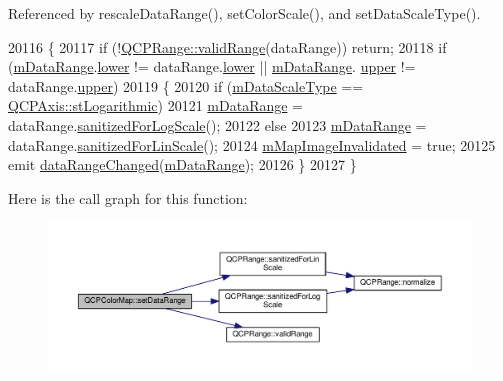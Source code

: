 Referenced by rescale\+Data\+Range(), set\+Color\+Scale(), and set\+Data\+Scale\+Type().


\begin{DoxyCode}
20116 \{
20117   \textcolor{keywordflow}{if} (!\hyperlink{class_q_c_p_range_ab38bd4841c77c7bb86c9eea0f142dcc0}{QCPRange::validRange}(dataRange)) \textcolor{keywordflow}{return};
20118   \textcolor{keywordflow}{if} (\hyperlink{class_q_c_p_color_map_ab87609621d16cd3e9d52ad070b327b08}{mDataRange}.\hyperlink{class_q_c_p_range_aa3aca3edb14f7ca0c85d912647b91745}{lower} != dataRange.\hyperlink{class_q_c_p_range_aa3aca3edb14f7ca0c85d912647b91745}{lower} || \hyperlink{class_q_c_p_color_map_ab87609621d16cd3e9d52ad070b327b08}{mDataRange}.
      \hyperlink{class_q_c_p_range_ae44eb3aafe1d0e2ed34b499b6d2e074f}{upper} != dataRange.\hyperlink{class_q_c_p_range_ae44eb3aafe1d0e2ed34b499b6d2e074f}{upper})
20119   \{
20120     \textcolor{keywordflow}{if} (\hyperlink{class_q_c_p_color_map_ab28a4b2def408f83b9818799d5f18446}{mDataScaleType} == \hyperlink{class_q_c_p_axis_a36d8e8658dbaa179bf2aeb973db2d6f0abf5b785ad976618816dc6f79b73216d4}{QCPAxis::stLogarithmic})
20121       \hyperlink{class_q_c_p_color_map_ab87609621d16cd3e9d52ad070b327b08}{mDataRange} = dataRange.\hyperlink{class_q_c_p_range_aaf6a9046e78d91eeb8e89584fe46b034}{sanitizedForLogScale}();
20122     \textcolor{keywordflow}{else}
20123       \hyperlink{class_q_c_p_color_map_ab87609621d16cd3e9d52ad070b327b08}{mDataRange} = dataRange.\hyperlink{class_q_c_p_range_a1ff029704c29a75adbc1dc36cecaf44c}{sanitizedForLinScale}();
20124     \hyperlink{class_q_c_p_color_map_ac9aea6a5c193d7fa866bc7b26e79ef2c}{mMapImageInvalidated} = \textcolor{keyword}{true};
20125     emit \hyperlink{class_q_c_p_color_map_a482980f2335d09cfb36dd95ba9663197}{dataRangeChanged}(\hyperlink{class_q_c_p_color_map_ab87609621d16cd3e9d52ad070b327b08}{mDataRange});
20126   \}
20127 \}
\end{DoxyCode}


Here is the call graph for this function\+:\nopagebreak
\begin{figure}[H]
\begin{center}
\leavevmode
\includegraphics[width=350pt]{class_q_c_p_color_map_a980b42837821159786a85b4b7dcb8774_cgraph}
\end{center}
\end{figure}




